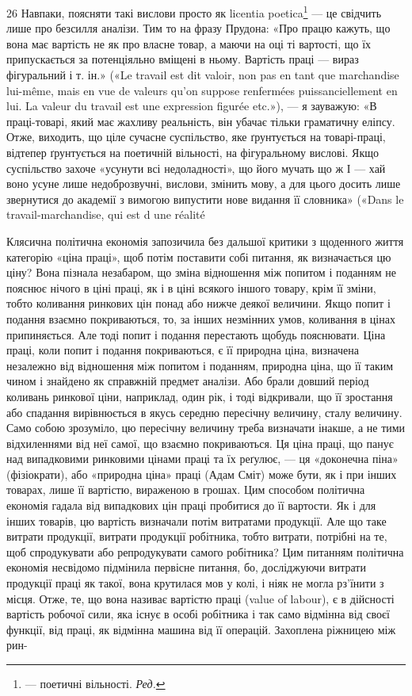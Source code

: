 26 Навпаки, поясняти такі вислови просто як licentia poetica\footnote*{
— поетичні вільності. \emph{Ред.}
} — це
свідчить лише про безсилля аналізи. Тим то на фразу Прудона: «Про
працю кажуть, що вона має вартість не як про власне товар, а маючи
на оці ті вартості, що їх припускається за потенціяльно вміщені в ньому.
Вартість праці — вираз фігуральний і т. ін.» («Le travail est dit valoir,
non pas en tant que marchandise lui-même, mais en vue de valeurs qu’on
suppose renfermées puissanciellement en lui. La valeur du travail est une
expression figurée etc.»), — я зауважую: «В праці-товарі, який має
жахливу реальність, він убачає тільки граматичну еліпсу. Отже,
виходить, що ціле сучасне суспільство, яке ґрунтується на товарі-праці,
відтепер ґрунтується на поетичній вільності, на фігуральному вислові.
Якщо суспільство захоче «усунути всі недоладності», що його мучать
що ж І — хай воно усуне лише недоброзвучні, вислови, змінить мову, а для
цього досить лише звернутися до академії з вимогою випустити нове
видання її словника» («Dans le travail-marchandise, qui est d une réalité

Клясична політична економія запозичила без дальшої критики
з щоденного життя категорію «ціна праці», щоб потім поставити
собі питання, як визначається цю ціну? Вона пізнала
незабаром, що зміна відношення між попитом і поданням не
пояснює нічого в ціні праці, як і в ціні всякого іншого товару,
крім її зміни, тобто коливання ринкових цін понад або нижче
деякої величини. Якщо попит і подання взаємно покриваються,
то, за інших незмінних умов, коливання в цінах припиняється.
Але тоді попит і подання перестають щобудь пояснювати. Ціна
праці, коли попит і подання покриваються, є її природна ціна,
визначена незалежно від відношення між попитом і поданням,
природна ціна, що її таким чином і знайдено як справжній предмет
аналізи. Або брали довший період коливань ринкової ціни,
наприклад, один рік, і тоді відкривали, що її зростання або
спадання вирівнюється в якусь середню пересічну величину,
сталу величину. Само собою зрозуміло, цю пересічну величину
треба визначати інакше, а не тими відхиленнями від неї самої,
що взаємно покриваються. Ця ціна праці, що панує над випадковими
ринковими цінами праці та їх реґулює, — ця «доконечна
піна» (фізіократи), або «природна ціна» праці (Адам Сміт) може
бути, як і при інших товарах, лише її вартістю, вираженою в
грошах. Цим способом політична економія гадала від випадкових
цін праці пробитися до її вартости. Як і для інших товарів,
цю вартість визначали потім витратами продукції. Але що таке
витрати продукції, витрати продукції робітника, тобто витрати,
потрібні на те, щоб спродукувати або репродукувати самого
робітника? Цим питанням політична економія несвідомо підмінила
первісне питання, бо, досліджуючи витрати продукції
праці як такої, вона крутилася мов у колі, і ніяк не могла рз’їнити
з місця. Отже, те, що вона називає вартістю праці (value of labour),
є в дійсності вартість робочої сили, яка існує в особі
робітника і так само відмінна від своєї функції, від праці, як
відмінна машина від її операцій. Захоплена ріжницею між рин-

